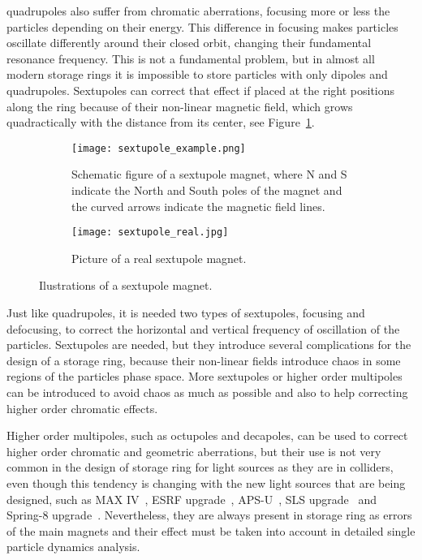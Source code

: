 \begin{description}[align=left]
        \item[Sextupoles:] quadrupoles also suffer from chromatic aberrations, focusing more or less the particles depending on their energy. This difference in focusing makes particles oscillate differently around their closed orbit, changing their fundamental resonance frequency. This is not a fundamental problem, but in almost all modern storage rings it is impossible to store particles with only dipoles and quadrupoles. Sextupoles can correct that effect if placed at the right positions along the ring because of their non-linear magnetic field, which grows quadractically with the distance from its center, see Figure~\ref{fig:sextupole}.
        \begin{figure}[t!]
            \centering
            \begin{subfigure}[c]{0.47\textwidth}
                \centering
                \texttt{[image: sextupole\_example.png]}
                \caption{Schematic figure of a sextupole magnet, where N and S indicate the North and South poles of the magnet and the curved arrows indicate the magnetic field lines.}
            \end{subfigure}\hfill
            \begin{subfigure}[c]{0.5\textwidth}
                \texttt{[image: sextupole\_real.jpg]}
                \caption{Picture of a real sextupole magnet.}
            \end{subfigure}
            \caption{Ilustrations of a sextupole magnet.}
            \label{fig:sextupole}
        \end{figure}
        Just like quadrupoles, it is needed two types of sextupoles, focusing and defocusing, to correct the horizontal and vertical frequency of oscillation of the particles. Sextupoles are needed, but they introduce several complications for the design of a storage ring, because their non-linear fields introduce chaos in some regions of the particles phase space. More sextupoles or higher order multipoles can be introduced to avoid chaos as much as possible and also to help correcting higher order chromatic effects.
    \end{description}

    Higher order multipoles, such as octupoles and decapoles, can be used to correct higher order chromatic and geometric aberrations, but their use is not very common in the design of storage ring for light sources as they are in colliders, even though this tendency is changing with the new light sources that are being designed, such as MAX IV~\cite{Leemann2009}, ESRF upgrade~\cite{Farvacque2013}, APS-U~\cite{Sun2013}, SLS upgrade~\cite{Soutome2016} and Spring-8 upgrade~\cite{Soutome2016}. Nevertheless, they are always present in storage ring as errors of the main magnets and their effect must be taken into account in detailed single particle dynamics analysis.

